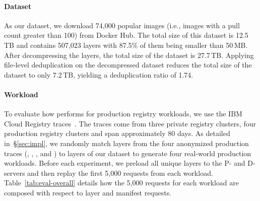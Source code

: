 \paragraph{Dataset}
%
As our dataset, we download 74,000 popular images (i.e., images with a pull count greater than 100) from Docker Hub.
% 
The total size of this dataset is 12.5\,TB and contains 507,023 layers with 87.5\% of them being smaller than 50\,MB.
%
After decompressing the layers, the total size of the dataset is 27.7\,TB.
%
Applying file-level deduplication on the decompressed dataset
reduces the total size of the dataset to only 7.2\,TB, yielding 
a deduplication ratio of 1.74.
%
%
  
\paragraph{Workload}
%
To evaluate how \sysname performs for production registry workloads, 
we use the IBM Cloud Registry traces~\cite{dockerworkload}.
%
The traces come from three private registry clusters, 
four production registry clusters and span approximately 80 days.
%
As detailed in~\S\ref{sec:impl}, we randomly match layers from the four anonymized production
traces (\dal, \fra, \lon, and \syd) to layers of our dataset to generate four real-world production workloads.
%
Before each experiment, we preload all unique layers to the P- and D-servers
and then replay the first 5,000 requests from each workload.
%
%
Table~\ref{tab:eval-overall} details how the 5,000 requests for each workload are composed
with respect to layer and manifest requests.


